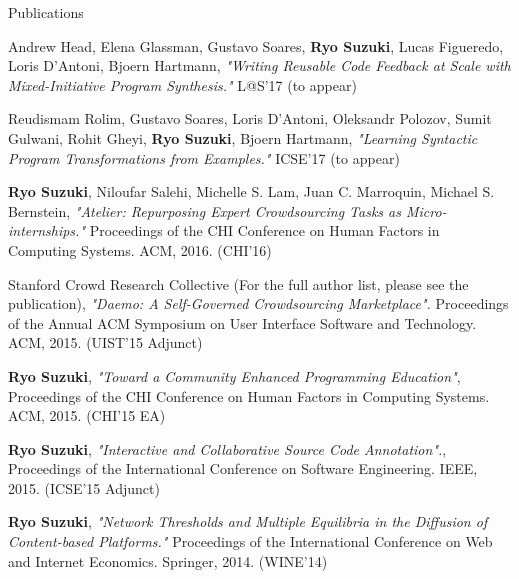\documentclass{resume} %
\begin{document}
\begin{rSection}{Publications}



Andrew Head, Elena Glassman, Gustavo Soares, {\bf Ryo Suzuki}, Lucas Figueredo, Loris D'Antoni, Bjoern Hartmann, {\it "Writing Reusable Code Feedback at Scale with Mixed-Initiative Program Synthesis."} L@S'17 (to appear)


Reudismam Rolim, Gustavo Soares, Loris D'Antoni, Oleksandr Polozov, Sumit Gulwani, Rohit Gheyi, {\bf Ryo Suzuki}, Bjoern Hartmann, {\it "Learning Syntactic Program Transformations from Examples."} ICSE'17 (to appear)

{\bf Ryo Suzuki}, Niloufar Salehi, Michelle S. Lam,
Juan C. Marroquin, Michael S. Bernstein,
{\it "Atelier: Repurposing Expert Crowdsourcing Tasks as Micro-internships."} Proceedings of the CHI Conference on Human Factors in Computing Systems. ACM, 2016. (CHI'16)

Stanford Crowd Research Collective (For the full author list, please see the publication), {\it "Daemo: A Self-Governed Crowdsourcing Marketplace".} Proceedings of the Annual ACM Symposium on User Interface Software and Technology. ACM, 2015. (UIST'15 Adjunct)

{\bf Ryo Suzuki}, {\it "Toward a Community Enhanced Programming Education"}, Proceedings of the CHI Conference on Human Factors in Computing Systems. ACM, 2015. (CHI'15 EA)

{\bf Ryo Suzuki}, {\it "Interactive and Collaborative Source Code Annotation".}, Proceedings of the International Conference on Software Engineering. IEEE, 2015. (ICSE'15 Adjunct)

{\bf Ryo Suzuki}, {\it "Network Thresholds and Multiple Equilibria in the Diffusion of Content-based Platforms."} Proceedings of the International Conference on Web and Internet Economics. Springer, 2014. (WINE'14)


\end{rSection}
\end{document}
